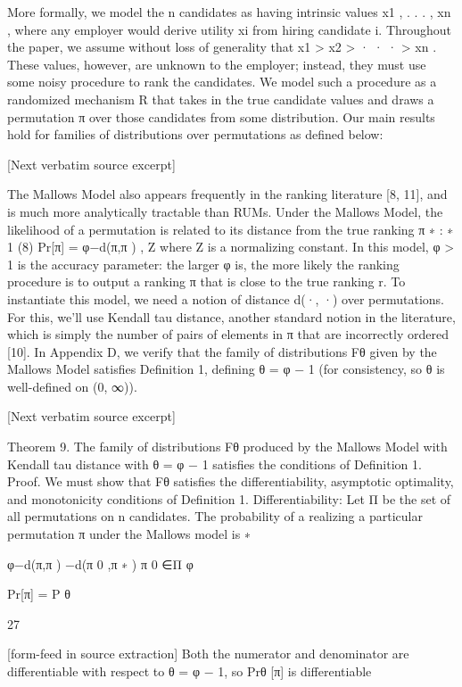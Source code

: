 \documentclass[10pt]{article}
\begin{document}
\begin{ReviewVerbatim}
More formally, we model the n candidates as having intrinsic values x1 , . . . , xn , where any employer would
derive utility xi from hiring candidate i. Throughout the paper, we assume without loss of generality that
x1 > x2 > · · · > xn . These values, however, are unknown to the employer; instead, they must use some
noisy procedure to rank the candidates. We model such a procedure as a randomized mechanism R that
takes in the true candidate values and draws a permutation π over those candidates from some distribution.
Our main results hold for families of distributions over permutations as defined below:

[Next verbatim source excerpt]

The Mallows Model also appears frequently in the ranking literature [8, 11], and is much more analytically
tractable than RUMs. Under the Mallows Model, the likelihood of a permutation is related to its distance
from the true ranking π ∗ :
∗
1
(8)
Pr[π] = φ−d(π,π ) ,
Z
where Z is a normalizing constant. In this model, φ > 1 is the accuracy parameter: the larger φ is, the
more likely the ranking procedure is to output a ranking π that is close to the true ranking r. To instantiate
this model, we need a notion of distance d(·, ·) over permutations. For this, we’ll use Kendall tau distance,
another standard notion in the literature, which is simply the number of pairs of elements in π that are
incorrectly ordered [10]. In Appendix D, we verify that the family of distributions Fθ given by the Mallows
Model satisfies Definition 1, defining θ = φ − 1 (for consistency, so θ is well-defined on (0, ∞)).

[Next verbatim source excerpt]

Theorem 9. The family of distributions Fθ produced by the Mallows Model with Kendall tau distance with
θ = φ − 1 satisfies the conditions of Definition 1.
Proof. We must show that Fθ satisfies the differentiability, asymptotic optimality, and monotonicity conditions of Definition 1.
Differentiability: Let Π be the set of all permutations on n candidates. The probability of a realizing
a particular permutation π under the Mallows model is
∗

φ−d(π,π )
−d(π 0 ,π ∗ )
π 0 ∈Π φ

Pr[π] = P
θ

27


[form-feed in source extraction]
Both the numerator and denominator are differentiable with respect to θ = φ − 1, so Prθ [π] is differentiable


\end{ReviewVerbatim}
\end{document}
